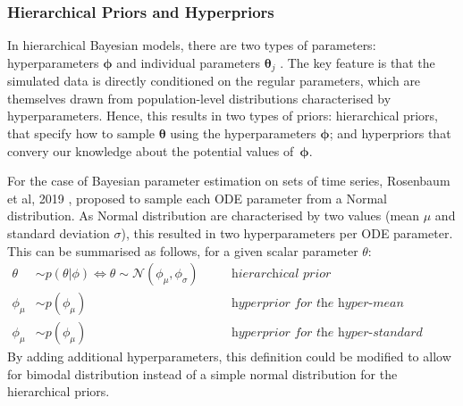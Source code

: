 \documentclass[11pt]{article}
\begin{document}
\subsubsection{Hierarchical Priors and Hyperpriors}\label{sec:hierPriorsAndHyper}
In hierarchical Bayesian models, there are two types of parameters: hyperparameters $\boldsymbol{\phi}$ and individual parameters $\boldsymbol{\theta}_j$ \cite{tbk_gelman}. The key feature is that the simulated data is directly conditioned on the regular parameters, which are themselves drawn from population-level distributions characterised by hyperparameters. Hence, this results in two types of priors: hierarchical priors, that specify how to sample $\boldsymbol{\theta}$ using the hyperparameters $\boldsymbol{\phi}$; and hyperpriors that convery our knowledge about the potential values of~$\boldsymbol{\phi}$.

For the case of Bayesian parameter estimation on sets of time series, Rosenbaum et al, 2019 \cite{rosenbaum}, proposed to sample each ODE parameter from a Normal distribution. As Normal distribution are characterised by two values (mean $\mu$ and standard deviation $\sigma$), this resulted in two hyperparameters per ODE parameter. This can be summarised as follows, for a given scalar parameter $\theta$:
\begin{align*}
    \theta &\sim p(\theta | \phi) \Leftrightarrow \theta \sim \mathcal{N}(\phi_\mu, \phi_\sigma) \quad &&\textit{hierarchical prior} \\ 
    \phi_\mu &\sim p(\phi_\mu) \quad &&\textit{hyperprior for the hyper-mean} \\ 
    \phi_\mu &\sim p(\phi_\mu) \quad &&\textit{hyperprior for the hyper-standard deviation} 
\end{align*}
By adding additional hyperparameters, this definition could be modified to allow for bimodal distribution instead of a simple normal distribution for the hierarchical priors.
\end{document}
